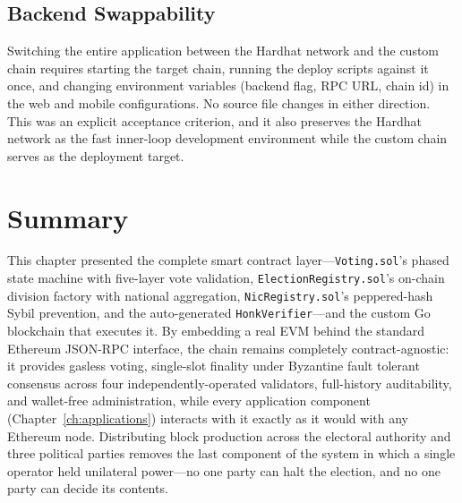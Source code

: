 \subsection{Backend Swappability}

Switching the entire application between the Hardhat network and the custom chain requires starting the target chain, running the deploy scripts against it once, and changing environment variables (backend flag, RPC URL, chain id) in the web and mobile configurations. No source file changes in either direction. This was an explicit acceptance criterion, and it also preserves the Hardhat network as the fast inner-loop development environment while the custom chain serves as the deployment target.

\section{Summary}

This chapter presented the complete smart contract layer---\texttt{Voting.sol}'s phased state machine with five-layer vote validation, \texttt{ElectionRegistry.sol}'s on-chain division factory with national aggregation, \texttt{NicRegistry.sol}'s peppered-hash Sybil prevention, and the auto-generated \texttt{HonkVerifier}---and the custom Go blockchain that executes it. By embedding a real EVM behind the standard Ethereum JSON-RPC interface, the chain remains completely contract-agnostic: it provides gasless voting, single-slot finality under Byzantine fault tolerant consensus across four independently-operated validators, full-history auditability, and wallet-free administration, while every application component (Chapter~\ref{ch:applications}) interacts with it exactly as it would with any Ethereum node. Distributing block production across the electoral authority and three political parties removes the last component of the system in which a single operator held unilateral power---no one party can halt the election, and no one party can decide its contents.
